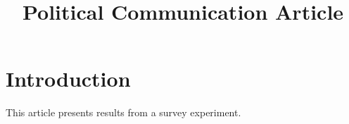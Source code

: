 \documentclass{article}
\begin{document}
\title{Political Communication Article}
\maketitle
\section{Introduction}
This article presents results from a survey experiment.
\end{document}
